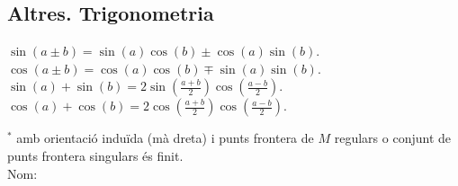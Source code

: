 \documentclass[10pt]{article}
\newcommand{\ci}{\textbullet\;}
\begin{document}
\begin{multicols}{4}
\subsection{Altres. Trigonometria}
\ci $\sin(a \pm b) = \sin(a)\cos(b) \pm \cos(a)\sin(b)$. \\
\ci $\cos(a \pm b) = \cos(a)\cos(b) \mp \sin(a)\sin(b)$. \\
\ci $\sin(a) + \sin(b) = 2\sin(\frac{a+b}{2})\cos(\frac{a-b}{2})$. \\
\ci $\cos(a) + \cos(b) = 2\cos(\frac{a+b}{2})\cos(\frac{a-b}{2})$.

\noindent\makebox[\linewidth]{\rule{\linewidth}{1pt}}
$^\ast$ amb orientació induïda (m\`a dreta) i punts frontera de $M$ regulars o conjunt de punts frontera singulars \'es finit. \\
\vspace{3pt}
\raggedleft
{\large Nom: \underline{\hspace{5cm}}}


\end{multicols}
\end{document}
